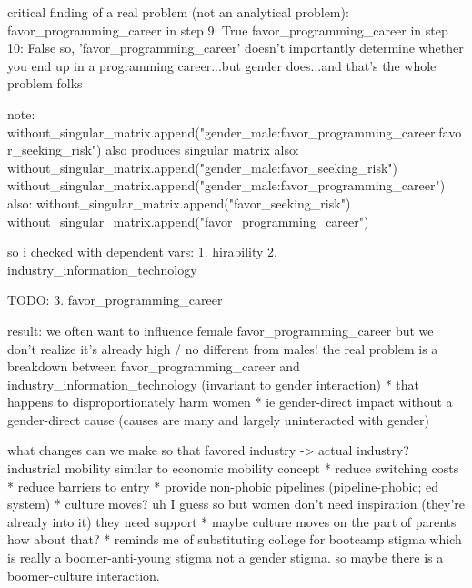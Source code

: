 \documentclass[review]{elsarticle}
\begin{document}



critical finding of a real problem (not an analytical problem):
    favor_programming_career in step 9: True
    favor_programming_career in step 10: False
so, 'favor_programming_career' doesn't importantly determine whether you end up in a programming career...but gender does...and that's the whole problem folks

note: without_singular_matrix.append("gender_male:favor_programming_career:favor_seeking_risk") also produces singular matrix
also:
without_singular_matrix.append("gender_male:favor_seeking_risk")
without_singular_matrix.append("gender_male:favor_programming_career")
also:
without_singular_matrix.append("favor_seeking_risk")
without_singular_matrix.append("favor_programming_career")

so i checked with dependent vars:
1. hirability
2. industry_information_technology

TODO:
3. favor_programming_career

result: we often want to influence female favor_programming_career but we don't realize it's already high / no different from males!
the real problem is a breakdown between favor_programming_career and industry_information_technology (invariant to gender interaction)
    * that happens to disproportionately harm women
    * ie gender-direct impact without a gender-direct cause (causes are many and largely uninteracted with gender)

what changes can we make so that favored industry -> actual industry? industrial mobility similar to economic mobility concept
    * reduce switching costs
    * reduce barriers to entry
    * provide non-phobic pipelines (pipeline-phobic; ed system)
    * culture moves? uh I guess so but women don't need inspiration (they're already into it) they need support
        * maybe culture moves on the part of parents how about that?
        * reminds me of substituting college for bootcamp stigma which is really a boomer-anti-young stigma not a gender stigma. so maybe there is a boomer-culture interaction.
\end{document}
